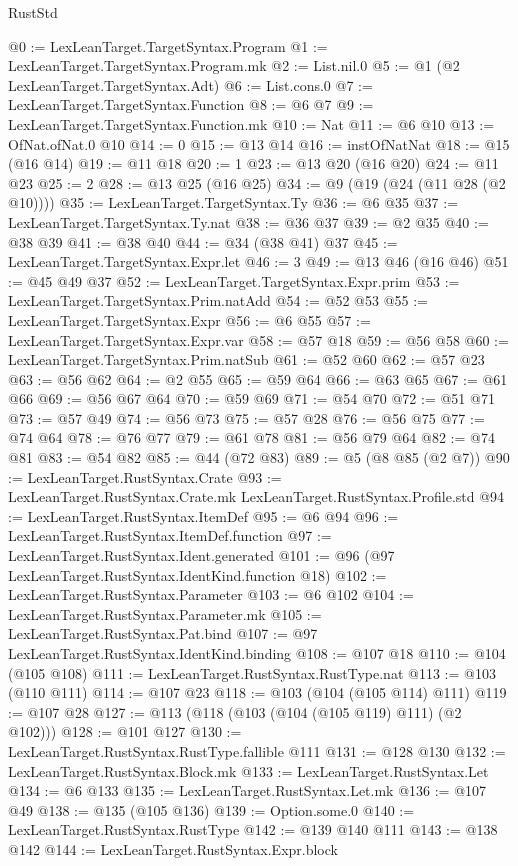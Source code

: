 \begin{lexlean}{RustStd}
\begin{coremodule}
@0 := LexLeanTarget.TargetSyntax.Program
@1 := LexLeanTarget.TargetSyntax.Program.mk
@2 := List.nil.{0}
@5 := @1 (@2 LexLeanTarget.TargetSyntax.Adt)
@6 := List.cons.{0}
@7 := LexLeanTarget.TargetSyntax.Function
@8 := @6 @7
@9 := LexLeanTarget.TargetSyntax.Function.mk
@10 := Nat
@11 := @6 @10
@13 := OfNat.ofNat.{0} @10
@14 := 0
@15 := @13 @14
@16 := instOfNatNat
@18 := @15 (@16 @14)
@19 := @11 @18
@20 := 1
@23 := @13 @20 (@16 @20)
@24 := @11 @23
@25 := 2
@28 := @13 @25 (@16 @25)
@34 := @9 (@19 (@24 (@11 @28 (@2 @10))))
@35 := LexLeanTarget.TargetSyntax.Ty
@36 := @6 @35
@37 := LexLeanTarget.TargetSyntax.Ty.nat
@38 := @36 @37
@39 := @2 @35
@40 := @38 @39
@41 := @38 @40
@44 := @34 (@38 @41) @37
@45 := LexLeanTarget.TargetSyntax.Expr.let
@46 := 3
@49 := @13 @46 (@16 @46)
@51 := @45 @49 @37
@52 := LexLeanTarget.TargetSyntax.Expr.prim
@53 := LexLeanTarget.TargetSyntax.Prim.natAdd
@54 := @52 @53
@55 := LexLeanTarget.TargetSyntax.Expr
@56 := @6 @55
@57 := LexLeanTarget.TargetSyntax.Expr.var
@58 := @57 @18
@59 := @56 @58
@60 := LexLeanTarget.TargetSyntax.Prim.natSub
@61 := @52 @60
@62 := @57 @23
@63 := @56 @62
@64 := @2 @55
@65 := @59 @64
@66 := @63 @65
@67 := @61 @66
@69 := @56 @67 @64
@70 := @59 @69
@71 := @54 @70
@72 := @51 @71
@73 := @57 @49
@74 := @56 @73
@75 := @57 @28
@76 := @56 @75
@77 := @74 @64
@78 := @76 @77
@79 := @61 @78
@81 := @56 @79 @64
@82 := @74 @81
@83 := @54 @82
@85 := @44 (@72 @83)
@89 := @5 (@8 @85 (@2 @7))
@90 := LexLeanTarget.RustSyntax.Crate
@93 := LexLeanTarget.RustSyntax.Crate.mk LexLeanTarget.RustSyntax.Profile.std
@94 := LexLeanTarget.RustSyntax.ItemDef
@95 := @6 @94
@96 := LexLeanTarget.RustSyntax.ItemDef.function
@97 := LexLeanTarget.RustSyntax.Ident.generated
@101 := @96 (@97 LexLeanTarget.RustSyntax.IdentKind.function @18)
@102 := LexLeanTarget.RustSyntax.Parameter
@103 := @6 @102
@104 := LexLeanTarget.RustSyntax.Parameter.mk
@105 := LexLeanTarget.RustSyntax.Pat.bind
@107 := @97 LexLeanTarget.RustSyntax.IdentKind.binding
@108 := @107 @18
@110 := @104 (@105 @108)
@111 := LexLeanTarget.RustSyntax.RustType.nat
@113 := @103 (@110 @111)
@114 := @107 @23
@118 := @103 (@104 (@105 @114) @111)
@119 := @107 @28
@127 := @113 (@118 (@103 (@104 (@105 @119) @111) (@2 @102)))
@128 := @101 @127
@130 := LexLeanTarget.RustSyntax.RustType.fallible @111
@131 := @128 @130
@132 := LexLeanTarget.RustSyntax.Block.mk
@133 := LexLeanTarget.RustSyntax.Let
@134 := @6 @133
@135 := LexLeanTarget.RustSyntax.Let.mk
@136 := @107 @49
@138 := @135 (@105 @136)
@139 := Option.some.{0}
@140 := LexLeanTarget.RustSyntax.RustType
@142 := @139 @140 @111
@143 := @138 @142
@144 := LexLeanTarget.RustSyntax.Expr.block

\end{coremodule}
\end{lexlean}

